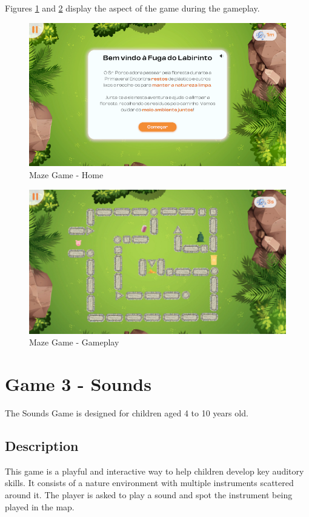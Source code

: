 Figures \ref{fig:mazeHome} and \ref{fig:mazeGameplay} display the aspect of the game during the gameplay.

\begin{figure}[H]
    \centering
    \includegraphics[width=0.9\linewidth]{Chapters/gameplay/new_screens/maze_home.png}
    \caption{Maze Game - Home}
    \label{fig:mazeHome}    
\end{figure}

\begin{figure}[H]
    \centering
    \includegraphics[width=0.9\linewidth]{Chapters/gameplay/MazeGame.jpg}
    \caption{Maze Game - Gameplay}
    \label{fig:mazeGameplay}    
\end{figure}

\section{Game 3 - Sounds}
\label{c3Sounds}

The Sounds Game is designed for children aged 4 to 10 years old.

\subsection*{Description}
This game is a playful and interactive way to help children develop key auditory skills. It consists of a nature environment with multiple instruments scattered around it. The player is asked to play a sound and spot the instrument being played in the map.

